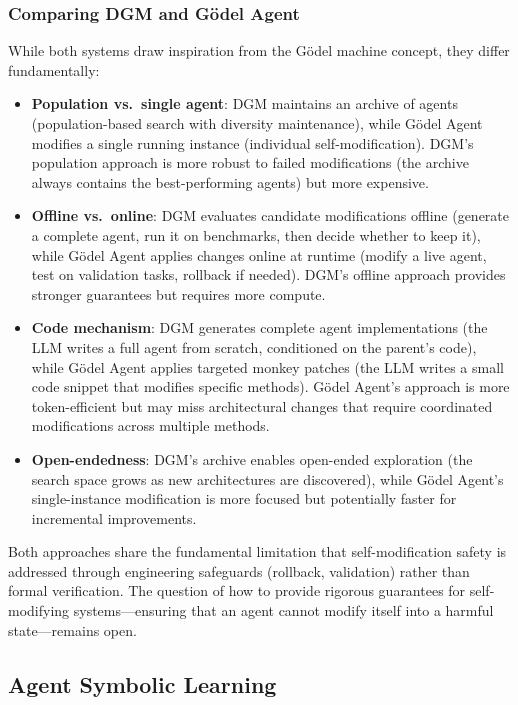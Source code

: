\subsubsection{Comparing DGM and G\"odel Agent}

While both systems draw inspiration from the G\"odel machine concept, they differ fundamentally:

\begin{itemize}
\item \textbf{Population vs.\ single agent}: DGM maintains an archive of agents (population-based search with diversity maintenance), while G\"odel Agent modifies a single running instance (individual self-modification). DGM's population approach is more robust to failed modifications (the archive always contains the best-performing agents) but more expensive.
\item \textbf{Offline vs.\ online}: DGM evaluates candidate modifications offline (generate a complete agent, run it on benchmarks, then decide whether to keep it), while G\"odel Agent applies changes online at runtime (modify a live agent, test on validation tasks, rollback if needed). DGM's offline approach provides stronger guarantees but requires more compute.
\item \textbf{Code mechanism}: DGM generates complete agent implementations (the LLM writes a full agent from scratch, conditioned on the parent's code), while G\"odel Agent applies targeted monkey patches (the LLM writes a small code snippet that modifies specific methods). G\"odel Agent's approach is more token-efficient but may miss architectural changes that require coordinated modifications across multiple methods.
\item \textbf{Open-endedness}: DGM's archive enables open-ended exploration (the search space grows as new architectures are discovered), while G\"odel Agent's single-instance modification is more focused but potentially faster for incremental improvements.
\end{itemize}

Both approaches share the fundamental limitation that self-modification safety is addressed through engineering safeguards (rollback, validation) rather than formal verification. The question of how to provide rigorous guarantees for self-modifying systems---ensuring that an agent cannot modify itself into a harmful state---remains open.

\subsection{Agent Symbolic Learning}
\label{sec:symbolic-learning}

